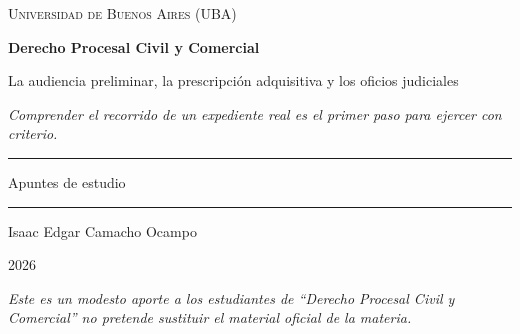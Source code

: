 \documentclass[12pt,oneside]{book}
\newcommand{\universidad}{Universidad de Buenos Aires (UBA)}
\newcommand{\materia}{Derecho Procesal Civil y Comercial}
\newcommand{\titulo}{La audiencia preliminar, la prescripción adquisitiva y los oficios judiciales}
\newcommand{\autor}{Isaac Edgar Camacho Ocampo}
\newcommand{\anio}{2026}
\newcommand{\reflexionmotivacional}{Comprender el recorrido de un expediente real es el primer paso para ejercer con criterio.}
\begin{document}
\begin{titlepage}

\thispagestyle{empty}

\begin{center}

\vspace*{1cm}

{\large \textsc{\universidad}}

\vspace{3cm}

{\Huge \textbf{\materia}}

\vspace{1cm}

{\LARGE \titulo}

\vspace{0.8cm}

\textit{\reflexionmotivacional}

\vspace{1.2cm}

\rule{0.70\textwidth}{0.5pt}

\vspace{0.5cm}

{\large Apuntes de estudio}

\vspace{0.5cm}

\rule{0.70\textwidth}{0.5pt}

\vfill

{\large \autor}

\vspace{0.3cm}

{\large \anio}

\end{center}

\vfill

\begin{flushleft}
\textit{Este es un modesto aporte a los estudiantes de ``\materia'' no pretende sustituir el material oficial de la materia.}
\end{flushleft}

\end{titlepage}

\tableofcontents

\end{document}
